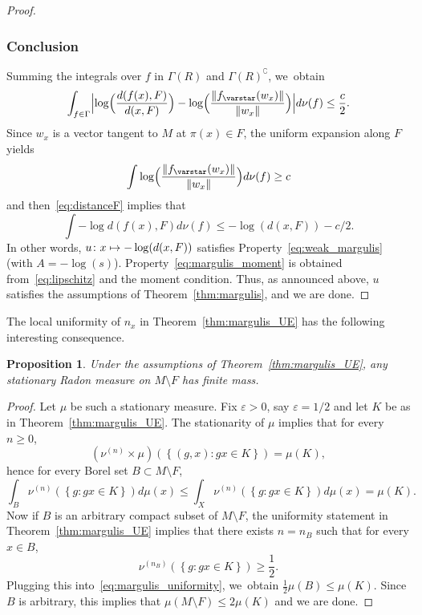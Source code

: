 \documentclass[JEP,XML,SOM,Unicode,published]{cedram}
\newcommand\mto{\mathchoice{\longmapsto}{\mapsto}{\mapsto}{\mapsto}}
\let\sep :
\let\e\varepsilon
\newcommand{\set}[1]{\left\{#1\right\}}
\newcommand{\norm}[1]{{\left\Vert#1\right\Vert}}
\newcommand{\Babs}[1]{\Bigl\vert#1\Bigr\vert}
\newcommand{\lrpar}[1]{\left(#1\right)}
\newcommand{\Blrpar}[1]{\Bigl(#1\Bigr)}
\theoremstyle{plain}
\newtheorem{pro}[thm]{Proposition}
\theoremstyle{definition}
\begin{document}
\begin{proof}
\subsubsection*{Conclusion}
Summing the integrals over $f$ in $\Gamma(R)$ and $\Gamma(R)^\complement$, we~obtain
\begin{equation}\label{eq:distanceF}
\int_{f\in \Gamma} \Babs{\log\Blrpar{\frac{d(f(x),F)}{d(x, F)}} - \log\Blrpar{\frac{\norm{f_\varstar (w_x)}}{\norm{w_x}}}} d\nu(f) \leq \frac{c}{2}.
\end{equation}
Since $w_x$ is a vector tangent to $M$ at $\pi(x)\in F$,
the uniform expansion along $F$ yields
\begin{equation*}\int \log\Blrpar{\frac{\norm{f_\varstar (w_x)}}{\norm{w_x}}} d\nu(f) \geq c
\end{equation*}
and
then~\eqref{eq:distanceF} implies that
\begin{equation*}
\int - \log {d(f(x),F)} d\nu(f) \leq - \log(d(x, F)) - c/2.
\end{equation*}
In other words, $u\colon x\mto -\log(d(x,F))$ satisfies Property~\eqref{eq:weak_margulis} (with $A=-\log(s)$). Property~\eqref{eq:margulis_moment} is obtained from~\eqref{eq:lipschitz} and the moment condition.
Thus, as announced above, $u$ satisfies the assumptions of Theorem~\ref{thm:margulis}, and we are done. \end{proof}

The local uniformity of $n_x$ in Theorem~\ref{thm:margulis_UE} has the following interesting consequence.

\begin{pro}\label{pro:finite_mass}
Under the assumptions of Theorem~\ref{thm:margulis_UE}, any stationary Radon measure on $M\setminus F$ has finite mass.
\end{pro}

\begin{proof}
Let $\mu$ be such a stationary measure. Fix $\e>0$, say $\e =1/2$ and
let $K$ be as in Theorem~\ref{thm:margulis_UE}. The stationarity of $\mu$ implies that for every $n\geq 0$,
\begin{equation*}
(\nu^{(n)}\times\mu)\lrpar{ \set{(g, x)\sep gx \in K}} = \mu(K),
\end{equation*}
hence for every Borel set $B\subset M\setminus F$,
\begin{equation}\label{eq:margulis_uniformity}
\int_B \nu^{(n)}\lrpar{\set{g\sep gx\in K}} d\mu(x) \leq \int_X \nu^{(n)}\lrpar{\set{g\sep gx\in K}} d\mu(x) = \mu(K).
\end{equation}
Now if $B$ is an arbitrary compact subset of $M\setminus F$, the uniformity statement in
Theorem~\ref{thm:margulis_UE} implies that there exists $n = n_B$ such that
for every $x\in B$,
\begin{equation*}
\nu^{(n_B)}\lrpar{\set{g\sep gx\in K}}\geq \frac12.
\end{equation*}
Plugging this into~\eqref{eq:margulis_uniformity}, we~obtain $\frac12 \mu(B) \leq \mu(K)$.
Since $B$ is arbitrary, this implies that $\mu(M\setminus F)\leq 2\mu(K)$ and we are done.
\end{proof}
\end{document}
